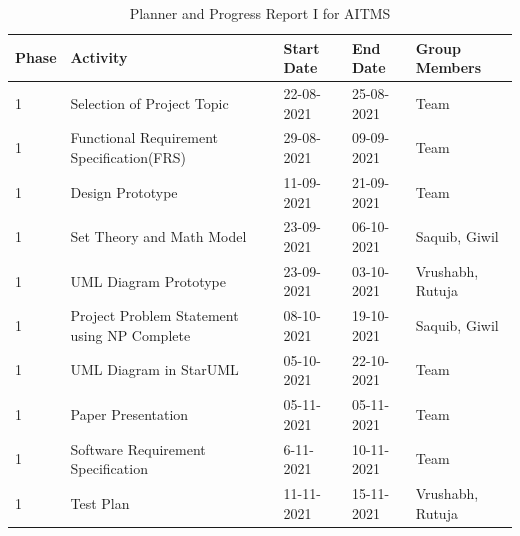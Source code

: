 \documentclass[openany,12pt]{report}
\begin{document}
	\newpage
	\begin{table} [htb]
		\centering
		\begin{tabular}{| p{1.2 cm}| p{5 cm}| p{2.5 cm}| p{2.5 cm}| p{3 cm}| }\hline
			\textbf{Phase}	&\textbf{Activity}	&\textbf{Start Date}	&\textbf{End Date} &\textbf{Group Members}\\\hline\hline
			1 &Selection of Project Topic	&22-08-2021 	&25-08-2021 &Team \\\hline
			1 &Functional Requirement Specification(FRS) &29-08-2021 &09-09-2021 &Team\\\hline
			1 &Design Prototype &11-09-2021 &21-09-2021 &Team\\\hline
			1 &Set Theory and Math Model &23-09-2021 &06-10-2021 & Saquib, Giwil\\\hline
			1 &UML Diagram Prototype &23-09-2021 &03-10-2021 &Vrushabh, \newline Rutuja \\\hline
			1 &Project Problem Statement using NP Complete &08-10-2021 &19-10-2021 &Saquib, Giwil\\\hline
			1 &UML Diagram in StarUML &05-10-2021 &22-10-2021 &Team \\\hline
			1 &Paper Presentation &05-11-2021 &05-11-2021 &Team \\\hline
			1 &Software Requirement Specification &6-11-2021 &10-11-2021 &Team \\\hline
			1 &Test Plan &11-11-2021 &15-11-2021 &Vrushabh, \newline Rutuja \\\hline
		\end{tabular}
		\caption{Planner and Progress Report I for AITMS}
		\label{tab:nnwork}
	\end{table}
\end{document}
